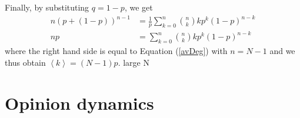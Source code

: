 \documentclass[11 pt , letterpaper , twoside , openright]{book}
\begin{document}
Finally, by substituting $q = 1-p$, we get \cite{Hopcroft2006}
\begin{equation}
\begin{split}
	n (p+(1-p))^{n-1} &= \frac{1}{p} \sum_{k=0}^n \binom{n}{k} k p^{k} (1-p)^{n-k} \\
	np &= \sum_{k=0}^n \binom{n}{k} k p^{k} (1-p)^{n-k}
\end{split}
\end{equation}
where the right hand side is equal to Equation (\ref{avDeg}) with $n = N-1$ and we thus obtain $\left<k\right> = (N-1)p$.
\cite{Albert2014} large N



\chapter{Opinion dynamics}
\label{chap3}


\newpage

\end{document}
